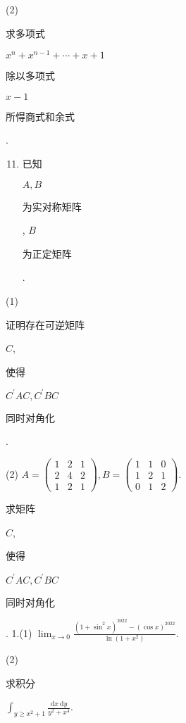 \documentclass[10pt]{article}
\begin{document}
(2) \begin{CJK}{UTF8}{mj}求多项式\end{CJK} $x^{n}+x^{n-1}+\cdots+x+1$ \begin{CJK}{UTF8}{mj}除以多项式\end{CJK} $x-1$ \begin{CJK}{UTF8}{mj}所㥂商式和余式\end{CJK}.

\begin{enumerate}
  \setcounter{enumi}{10}
  \item \begin{CJK}{UTF8}{mj}已知\end{CJK} $A, B$ \begin{CJK}{UTF8}{mj}为实对称矩阵\end{CJK}, $B$ \begin{CJK}{UTF8}{mj}为正定矩阵\end{CJK}.
\end{enumerate}
(1) \begin{CJK}{UTF8}{mj}证明存在可逆矩阵\end{CJK} $C$, \begin{CJK}{UTF8}{mj}使得\end{CJK} $C^{\prime} A C, C^{\prime} B C$ \begin{CJK}{UTF8}{mj}同时对角化\end{CJK}.

(2) $A=\left(\begin{array}{lll}1 & 2 & 1 \\ 2 & 4 & 2 \\ 1 & 2 & 1\end{array}\right), B=\left(\begin{array}{ccc}1 & 1 & 0 \\ 1 & 2 & 1 \\ 0 & 1 & 2\end{array}\right)$. \begin{CJK}{UTF8}{mj}求矩阵\end{CJK} $C$, \begin{CJK}{UTF8}{mj}使得\end{CJK} $C^{\prime} A C, C^{\prime} B C$ \begin{CJK}{UTF8}{mj}同时对角化\end{CJK}. 1.(1) $\lim _{x \rightarrow 0} \frac{\left(1+\sin ^{2} x\right)^{2022}-(\cos x)^{2022}}{\ln \left(1+x^{2}\right)}$.

(2) \begin{CJK}{UTF8}{mj}求积分\end{CJK} $\int_{y \geq x^{2}+1} \frac{\mathrm{d} x \mathrm{~d} y}{y^{2}+x^{4}}$.
\end{document}
